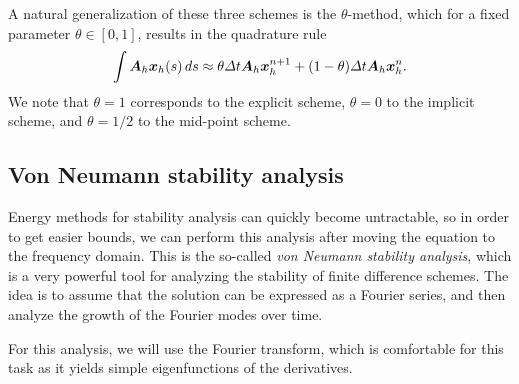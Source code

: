 A natural generalization of these three schemes is the $\theta$-method, which for a fixed parameter $\theta\in[0,1]$, results in the quadrature rule
\begin{equation}
    \int \mat A_h \vec x_h(s)\,ds \approx \theta\Delta t \mat A_h\vec x_h^{n+1} + (1-\theta)\Delta t \mat A_h \vec x_h^n.
\end{equation}
We note that $\theta=1$ corresponds to the explicit scheme, $\theta=0$ to the implicit scheme, and $\theta=1/2$ to the mid-point scheme. 
    
\subsection{Von Neumann stability analysis}
Energy methods for stability analysis can quickly become untractable, so in order to get easier bounds, we can perform this analysis after moving the equation to the frequency domain. This is the so-called \emph{von Neumann stability analysis}, which is a very powerful tool for analyzing the stability of finite difference schemes. The idea is to assume that the solution can be expressed as a Fourier series, and then analyze the growth of the Fourier modes over time.

For this analysis, we will use the Fourier transform, which is comfortable for this task as it yields simple eigenfunctions of the derivatives. 

